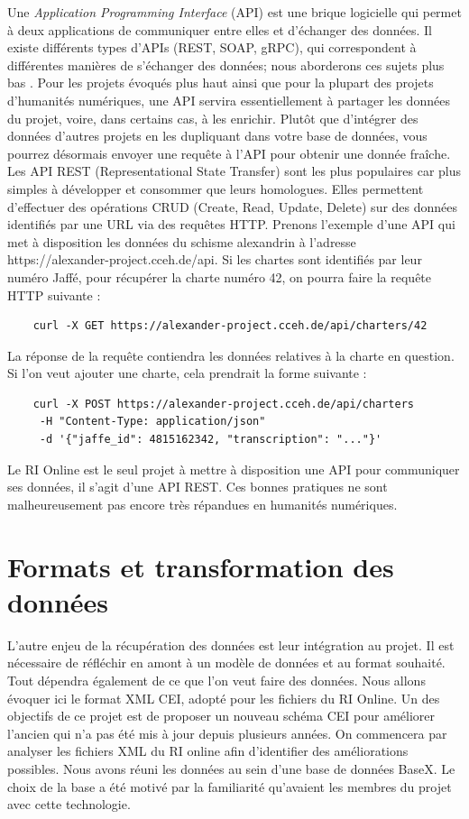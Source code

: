 Une \textit{Application Programming Interface} (API) est une brique logicielle qui permet à deux applications de communiquer entre elles et d’échanger des données. Il existe différents types d’APIs (REST, SOAP, gRPC), qui correspondent à différentes manières de s’échanger des données; nous aborderons ces sujets plus bas . Pour les projets évoqués plus haut ainsi que pour la plupart des projets d’humanités numériques, une API servira essentiellement à partager les données du projet, voire, dans certains cas, à les enrichir. Plutôt que d’intégrer des données d’autres projets en les dupliquant dans votre base de données, vous pourrez désormais envoyer une requête à l’API pour obtenir une donnée fraîche.  
Les API REST (Representational State Transfer) sont les plus populaires car plus simples à développer et consommer que leurs homologues. Elles permettent d’effectuer des opérations CRUD (Create, Read, Update, Delete) sur des données identifiés par une URL via des requêtes HTTP. Prenons l’exemple d’une API qui met à disposition les données du schisme alexandrin à l’adresse https://alexander-project.cceh.de/api. Si les chartes sont identifiés par leur numéro Jaffé, pour récupérer la charte numéro 42, on pourra faire la requête HTTP suivante : 
\begin{lstlisting}
    curl -X GET https://alexander-project.cceh.de/api/charters/42
\end{lstlisting}

\noindent La réponse de la requête contiendra les données relatives à la charte en question. 
Si l’on veut ajouter une charte, cela prendrait la forme suivante : 

\begin{lstlisting}
    curl -X POST https://alexander-project.cceh.de/api/charters
     -H "Content-Type: application/json"
     -d '{"jaffe_id": 4815162342, "transcription": "..."}' 
\end{lstlisting}


\noindent Le RI Online est le seul projet à mettre à disposition une API pour communiquer ses données, il s’agit d’une API REST. Ces bonnes pratiques ne sont malheureusement pas encore très répandues en humanités numériques.


    \section{Formats et transformation des données}

L’autre enjeu de la récupération des données est leur intégration au projet. Il est nécessaire de réfléchir en amont à un modèle de données et au format souhaité. Tout dépendra également de ce que l’on veut faire des données. Nous allons évoquer ici le format XML CEI, adopté pour les fichiers du RI Online. 
Un des objectifs de ce projet est de proposer un nouveau schéma CEI pour améliorer l’ancien qui n’a pas été mis à jour depuis plusieurs années. On commencera par analyser les fichiers XML du RI online afin d’identifier des améliorations possibles. Nous avons réuni les données au sein d’une base de données BaseX. Le choix de la base a été motivé par la familiarité qu’avaient les membres du projet avec cette technologie. 

